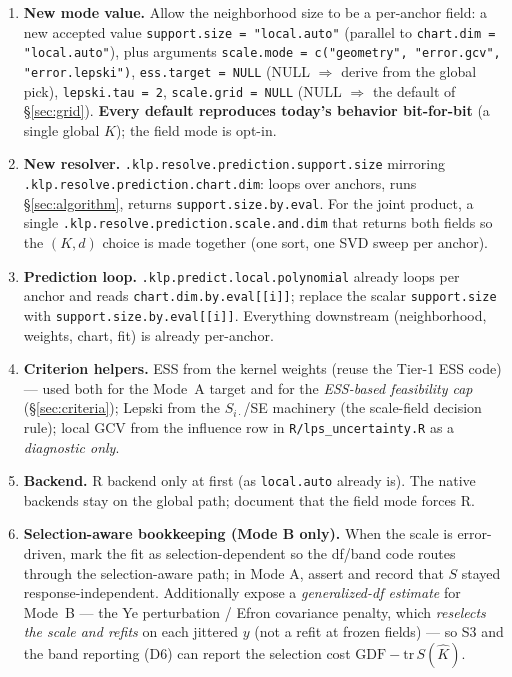 \documentclass[11pt]{article}
\newcommand{\code}[1]{\texttt{#1}}
\begin{document}
\begin{enumerate}[leftmargin=1.5em]
\item[I1.] \textbf{New mode value.} Allow the neighborhood size to be a per-anchor
field: a new accepted value \code{support.size = "local.auto"} (parallel to
\code{chart.dim = "local.auto"}), plus arguments \code{scale.mode = c("geometry",
"error.gcv", "error.lepski")}, \code{ess.target = NULL} (NULL $\Rightarrow$ derive
from the global pick), \code{lepski.tau = 2}, \code{scale.grid = NULL} (NULL
$\Rightarrow$ the default of \S\ref{sec:grid}). \textbf{Every default reproduces
today's behavior bit-for-bit} (a single global $K$); the field mode is opt-in.
\item[I2.] \textbf{New resolver.} \code{.klp.resolve.prediction.support.size}
mirroring \code{.klp.resolve.prediction.chart.dim}: loops over anchors, runs
\S\ref{sec:algorithm}, returns \code{support.size.by.eval}. For the joint product,
a single \code{.klp.resolve.prediction.scale.and.dim} that returns both fields so the
$(K,d)$ choice is made together (one sort, one SVD sweep per anchor).
\item[I3.] \textbf{Prediction loop.} \code{.klp.predict.local.polynomial} already
loops per anchor and reads \code{chart.dim.by.eval[[i]]}; replace the scalar
\code{support.size} with \code{support.size.by.eval[[i]]}. Everything downstream
(neighborhood, weights, chart, fit) is already per-anchor.
\item[I4.] \textbf{Criterion helpers.} ESS from the kernel weights (reuse the Tier-1
ESS code) --- used both for the Mode~A target and for the \emph{ESS-based feasibility cap}
(\S\ref{sec:criteria}); Lepski from the $S_{i\cdot}$/SE machinery (the scale-field decision
rule); local GCV from the influence row in \code{R/lps\_uncertainty.R} as a
\emph{diagnostic only}.
\item[I5.] \textbf{Backend.} R backend only at first (as \code{local.auto} already
is). The native backends stay on the global path; document that the field mode forces
R.
\item[I6.] \textbf{Selection-aware bookkeeping (Mode B only).} When the scale is
error-driven, mark the fit as selection-dependent so the df/band code routes through
the selection-aware path; in Mode A, assert and record that $S$ stayed
response-independent. Additionally expose a \emph{generalized-df estimate} for Mode~B
--- the Ye perturbation / Efron covariance penalty, which \emph{reselects the scale and
refits} on each jittered $y$ (not a refit at frozen fields) --- so S3 and the band
reporting (D6) can report the selection cost $\mathrm{GDF}-\mathrm{tr}\,S(\hat K)$.
\end{enumerate}
\end{document}
